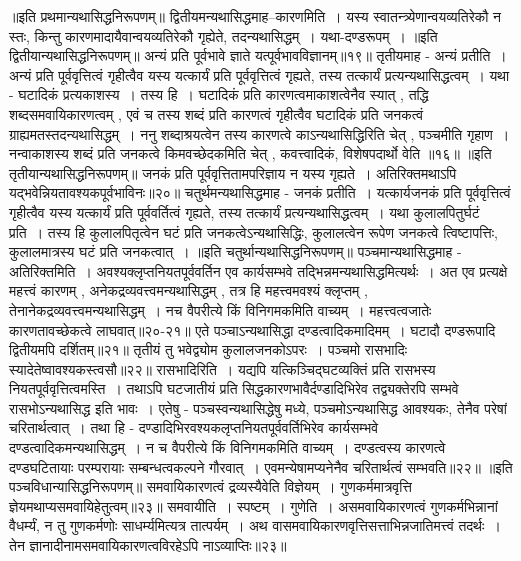 ॥इति प्रथमान्यथासिद्धनिरूपणम्॥
द्वितीयमन्यथासिद्धमाह--कारणमिति~। यस्य स्वातन्त्र्येणान्वयव्यतिरेकौ न स्तः, किन्तु कारणमादायैवान्वयव्यतिरेकौ गृह्येते, तदन्यथासिद्धम्~। यथा-दण्डरूपम्~।
॥इति द्वितीयान्यथासिद्धनिरूपणम्॥
अन्यं प्रति पूर्वभावे ज्ञाते यत्पूर्वभावविज्ञानम्॥१९॥
तृतीयमाह - अन्यं प्रतीति~। अन्यं प्रति पूर्ववृत्तित्वं गृहीत्वैव यस्य यत्कार्यं प्रति पूर्ववृत्तित्वं गृह्यते, तस्य तत्कार्यं प्रत्यन्यथासिद्धत्वम्~। यथा - घटादिकं प्रत्यकाशस्य~।
तस्य हि~। घटादिकं प्रति कारणत्वमाकाशत्वेनैव स्यात् , तद्धि शब्दसमवायिकारणत्वम् , एवं च तस्य शब्दं प्रति कारणत्वं गृहीत्वैव घटादिकं प्रति जनकत्वं ग्राह्यमतस्तदन्यथासिद्धम्~।
ननु शब्दाश्रयत्वेन तस्य कारणत्वे काऽन्यथासिद्धिरिति चेत् , पञ्चमीति गृहाण~। नन्वाकाशस्य शब्दं प्रति जनकत्वे किमवच्छेदकमिति चेत् , कवत्त्वादिकं,
विशेषपदार्थो वेति ॥१६॥
॥इति तृतीयान्यथासिद्धनिरूपणम्॥
जनकं प्रति पूर्ववृत्तितामपरिज्ञाय न यस्य गृह्यते~।
अतिरिक्तमथाऽपि यद्भवेन्नियतावश्यकपूर्वभाविनः॥२०॥
चतुर्थमन्यथासिद्धमाह - जनकं प्रतीति~। यत्कार्यजनकं प्रति पूर्ववृत्तित्वं गृहीत्वैव यस्य यत्कार्यं प्रति पूर्ववर्तित्वं गृह्यते, तस्य तत्कार्यं प्रत्यन्यथासिद्धत्वम्~। यथा
कुलालपितुर्घटं प्रति~। तस्य हि कुलालपितृत्वेन घटं प्रति जनकत्वेऽन्यथासिद्धिः, कुलालत्वेन रूपेण जनकत्वे त्विष्टापत्तिः, कुलालमात्रस्य घटं प्रति जनकत्वात्~।
॥इति चतुर्थान्यथासिद्धनिरूपणम्॥
पञ्चमान्यथासिद्धमाह - अतिरिक्तमिति~। अवश्यक्लृप्तनियतपूर्ववर्तिन एव कार्यसम्भवे तद्भिन्नमन्यथासिद्धमित्यर्थः~। अत एव प्रत्यक्षे महत्त्वं कारणम् ,
अनेकद्रव्यवत्त्वमन्यथासिद्धम् , तत्र हि महत्त्वमवश्यं क्लृप्तम् , तेनानेकद्रव्यवत्त्वमन्यथासिद्धम्~। नच वैपरीत्ये किं विनिगमकमिति वाच्यम्~। महत्त्वत्वजातेः कारणतावच्छेकत्वे
लाघवात्॥२०-२१॥
एते पञ्चाऽन्यथासिद्धा दण्डत्वादिकमादिमम्~।
घटादौ दण्डरूपादि द्वितीयमपि दर्शितम्॥२१॥
तृतीयं तु भवेद्व्योम कुलालजनकोऽपरः~।
पञ्चमो रासभादिः स्यादेतेष्वावश्यकस्त्वसौ॥२२॥
रासभादिरिति~। यद्यपि यत्किञ्चिद्घटव्यक्तिं प्रति रासभस्य नियतपूर्ववृत्तित्वमस्ति~। तथाऽपि घटजातीयं प्रति सिद्धकारणभावैर्दण्डादिभिरेव तद्व्यक्तेरपि सम्भवे
रासभोऽन्यथासिद्ध इति भावः~। एतेषु - पञ्चस्वन्यथासिद्धेषु मध्ये, पञ्चमोऽन्यथासिद्ध आवश्यकः, तेनैव परेषां चरितार्थत्वात्~। तथा हि - दण्डादिभिरवश्यकलृप्तनियतपूर्ववर्तिभिरेव
कार्यसम्भवे दण्डत्वादिकमन्यथासिद्धम्~। न च वैपरीत्ये किं विनिगमकमिति वाच्यम्~। दण्डत्वस्य कारणत्वे दण्डघटितायाः परम्परायाः सम्बन्धत्वकल्पने गौरवात्~।
एवमन्येषामप्यनेनैव चरितार्थत्वं सम्भवति॥२२॥
॥इति पञ्चविधान्यासिद्धनिरूपणम्॥
समवायिकारणत्वं द्रव्यस्यैवेति विज्ञेयम्~।
गुणकर्ममात्रवृत्ति ज्ञेयमथाप्यसमवायिहेतुत्वम्॥२३॥
समवायीति~। स्पष्टम्~।
गुणेति~। असमवायिकारणत्वं गुणकर्मभिन्नानां वैधर्म्यं, न तु गुणकर्मणोः साधर्म्यमित्यत्र तात्पर्यम्~।
अथ वासमवायिकारणवृत्तिसत्ताभिन्नजातिमत्त्वं तदर्थः~। तेन ज्ञानादीनामसमवायिकारणत्वविरहेऽपि नाऽव्याप्तिः॥२३॥
